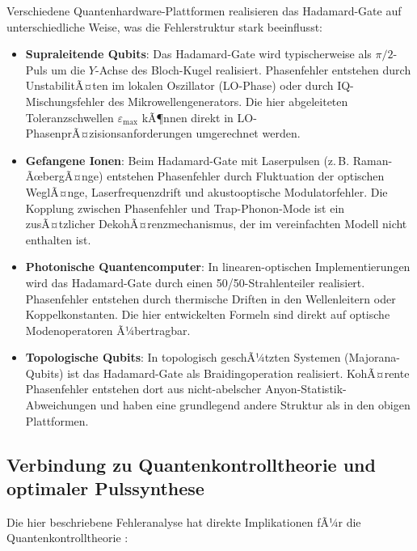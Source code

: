 ﻿\documentclass[11pt,a4paper]{article}
\theoremstyle{definition}
\newcommand{\eps}{\varepsilon}
\begin{document}
Verschiedene Quantenhardware-Plattformen realisieren das Hadamard-Gate
auf unterschiedliche Weise, was die Fehlerstruktur stark beeinflusst:

\begin{itemize}
  \item \textbf{Supraleitende Qubits}: Das Hadamard-Gate wird typischerweise
        als $\pi/2$-Puls um die $Y$-Achse des Bloch-Kugel realisiert.
        Phasenfehler entstehen durch UnstabilitÃ¤ten im lokalen Oszillator
        (LO-Phase) oder durch IQ-Mischungsfehler des Mikrowellengenerators.
        Die hier abgeleiteten Toleranzschwellen $\eps_{\max}$ kÃ¶nnen direkt
        in LO-PhasenprÃ¤zisionsanforderungen umgerechnet werden.

  \item \textbf{Gefangene Ionen}: Beim Hadamard-Gate mit Laserpulsen
        (z.\,B. Raman-ÃœbergÃ¤nge) entstehen Phasenfehler durch Fluktuation
        der optischen WeglÃ¤nge, Laserfrequenzdrift und akustooptische
        Modulatorfehler.  Die Kopplung zwischen Phasenfehler und
        Trap-Phonon-Mode ist ein zusÃ¤tzlicher DekohÃ¤renzmechanismus,
        der im vereinfachten Modell nicht enthalten ist.

  \item \textbf{Photonische Quantencomputer}: In linearen-optischen
        Implementierungen wird das Hadamard-Gate durch einen
        50/50-Strahlenteiler realisiert.  Phasenfehler entstehen durch
        thermische Driften in den Wellenleitern oder Koppelkonstanten.
        Die hier entwickelten Formeln sind direkt auf optische Modenoperatoren
        Ã¼bertragbar.

  \item \textbf{Topologische Qubits}: In topologisch geschÃ¼tzten
        Systemen (Majorana-Qubits) ist das Hadamard-Gate als Braidingoperation
        realisiert.  KohÃ¤rente Phasenfehler entstehen dort aus
        nicht-abelscher Anyon-Statistik-Abweichungen und haben eine
        grundlegend andere Struktur als in den obigen Plattformen.
\end{itemize}

\subsection{Verbindung zu Quantenkontrolltheorie und optimaler Pulssynthese}
\label{subsec:control}

Die hier beschriebene Fehleranalyse hat direkte Implikationen fÃ¼r die
Quantenkontrolltheorie \cite{D'Alessandro2007}:
\end{document}
